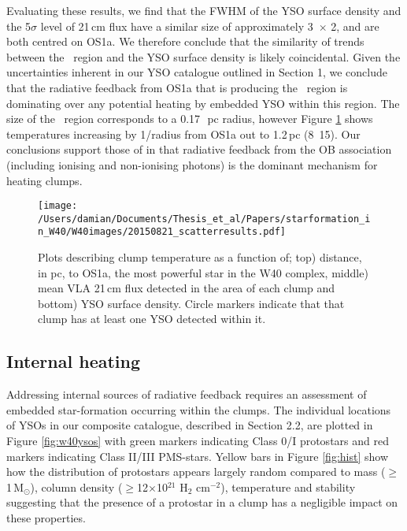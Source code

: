 Evaluating these results, we find that the FWHM of the YSO surface density and the 5$\sigma$ 
level of 21\,cm flux have a similar size of approximately 3\arcsec\ $\times$ 
2\arcsec, and are both centred on OS1a. We therefore conclude that the similarity of 
trends between the \HII\ region and the YSO surface density is likely coincidental. Given the 
uncertainties inherent in our YSO catalogue outlined in Section 1, we conclude that the radiative 
feedback from OS1a that is producing the \HII\ region is dominating over any potential heating by 
embedded YSO within this region. The size of the \HII\ region corresponds to a 0.17\,\hbox{ pc} 
radius, however Figure \ref{fig:scatter} shows temperatures increasing by 1/radius from OS1a 
out to 1.2\,pc (8\arcmin\ 15\arcsec). Our conclusions support those of \cite{Matzner:2002qf} in 
that radiative feedback from the OB association (including ionising and non-ionising photons) 
is the dominant mechanism for heating clumps. 

\begin{figure}
\begin{center}
\texttt{[image: /Users/damian/Documents/Thesis\_et\_al/Papers/starformation\_in\_W40/W40images/20150821\_scatterresults.pdf]}
\caption{Plots describing clump temperature as a function of; top) distance, in pc, to OS1a, the most powerful star in the W40 complex, middle) mean VLA 21\,cm flux detected in the area of each clump and bottom) YSO surface density. Circle markers indicate that that clump has at least one YSO detected within it.}
\label{fig:scatter}
\end{center}
\end{figure}

\subsection{Internal heating}

Addressing internal sources of radiative feedback requires an assessment of embedded star-formation 
occurring within the clumps. The individual locations of YSOs in our composite catalogue, described in 
Section 2.2, are plotted in Figure \ref{fig:w40ysos} with green markers indicating Class 0/I protostars 
and red markers indicating Class II/III PMS-stars. Yellow bars in Figure \ref{fig:hist} show how the 
distribution of protostars appears largely random compared to mass ($\geq$1\,M$_{\odot}$), column 
density ($\geq$12$\times$10$^{21}$ H$_{2}$ cm$^{-2}$), temperature and stability suggesting that 
the presence of a protostar in a clump has a negligible impact on these properties.

